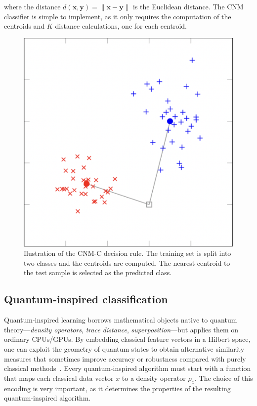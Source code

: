 \documentclass[twocolumn]{article} %
\begin{document}
where the distance \(d(\mathbf x, \mathbf y) = \|\mathbf x - \mathbf y\|\) is the Euclidean distance. 
The CNM classifier is simple to implement, as it only requires the computation of the centroids and $K$ distance calculations, one for each centroid.


\begin{figure}[h]
    \centering
    \includegraphics[width=0.6\linewidth]{figures/nearest_mean_classifier.png}
    \caption{Ilustration of the CNM-C decision rule. The training set is split into two classes and the centroids are computed. The nearest centroid to the test sample is selected as the predicted class.}
    \label{fig:nearest_mean_classifier}
\end{figure}

\subsection{Quantum-inspired classification}
\label{subsec:qic}

Quantum-inspired learning borrows mathematical objects native to
quantum theory—\emph{density operators}, \emph{trace distance},
\emph{superposition}—but applies them on ordinary CPUs/GPUs.  By
embedding classical feature vectors in a Hilbert space, one can exploit
the geometry of quantum states to obtain alternative similarity
measures that sometimes improve accuracy or robustness compared with
purely classical methods~\cite{Sergioli2025}. 
Every quantum-inspired algorithm must start with a function that maps each classical data vector $x$ to a density operator $\rho_x$.  
The choice of this encoding is very important, as it determines the properties of the resulting quantum-inspired algorithm.  
\end{document}
